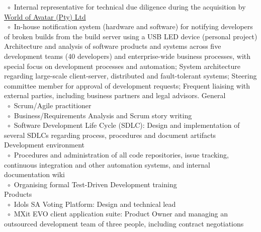 \documentclass[10pt,a4paper,final]{columncv}
\newcommand{\cvitembullet}{~$\circ$~}
\newcommand{\cvitempbullet}{\phantom{\cvitembullet}}
\begin{document}
\begin{cvenv}
{         \cvitembullet Internal representative for technical due diligence during the 
         \cvitempbullet acquisition by \href{http://www.worldofavatar.com/}{World of Avatar (Pty) Ltd} \\
         \cvitembullet In-house notification system (hardware and software) for notifying 
         \cvitempbullet developers of broken builds from the build server using a USB
         \cvitempbullet LED device (personal project)
         \\}
         {Architecture and analysis of software products and systems across five 
          development teams (40 developers) and enterprise-wide business processes, with 
          special focus on development processes and automation; System architecture 
          regarding large-scale client-server, distributed and fault-tolerant systems;
          Steering committee member for approval of development requests; Frequent 
          liaising with external parties, including business partners and legal advisors.}
         {General \\
          \cvitembullet Scrum/Agile practitioner \\
          \cvitembullet Business/Requirements Analysis and Scrum story writing \\
          \cvitembullet Software Development Life Cycle (SDLC): Design and 
          \cvitempbullet implementation of several SDLCs regarding process, procedures 
          \cvitempbullet and document artifacts \\
          Development environment \\
          \cvitembullet Procedures and administration of all code repositories, issue 
          \cvitempbullet tracking, continuous integration and other automation systems, 
          \cvitempbullet and internal documentation wiki \\
          \cvitembullet Organising formal Test-Driven Development training \\
          Products \\
	  \cvitembullet Idols SA Voting Platform: Design and technical lead \\
          \cvitembullet MXit EVO client application suite: Product Owner and managing
          \cvitempbullet an outsourced development team of three people, including 
          \cvitempbullet contract negotiations \\
}
\end{cvenv}
\end{document}
